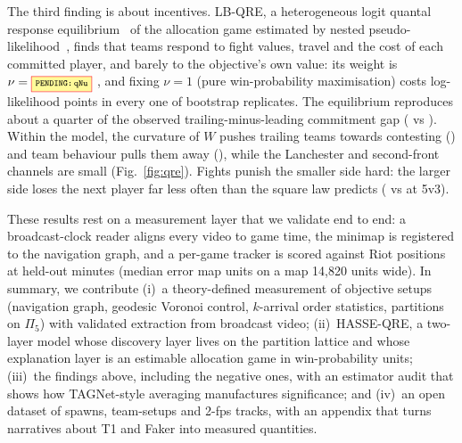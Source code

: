 The third finding is about incentives. LB-QRE, a heterogeneous logit quantal response equilibrium~\cite{mckelvey1995quantal} of the allocation game estimated by nested pseudo-likelihood~\cite{aguirregabiria2007sequential}, finds that teams respond to fight values, travel and the cost of each committed player, and barely to the objective's own value: its weight is $\nu=\V{qNu}$ , and fixing $\nu=1$ (pure win-probability maximisation) costs  log-likelihood points in every one of  bootstrap replicates.
The equilibrium reproduces about a quarter of the observed trailing-minus-leading commitment gap ( vs \pp).
Within the model, the curvature of $W$ pushes trailing teams towards contesting (\pp) and team behaviour pulls them away (\pp), while the Lanchester and second-front channels are small (Fig.~\ref{fig:qre}).
Fights punish the smaller side hard: the larger side loses the next player far less often than the square law predicts ( vs  at 5v3).

These results rest on a measurement layer that we validate end to end: a broadcast-clock reader aligns every video to game time, the minimap is registered to the navigation graph, and a per-game tracker is scored against Riot positions at held-out minutes (median error  map units on a map 14,820 units wide).
In summary, we contribute
(i)~a theory-defined measurement of objective setups (navigation graph, geodesic Voronoi control, $k$-arrival order statistics, partitions on $\Pi_5$) with validated extraction from broadcast video;
(ii)~HASSE-QRE, a two-layer model whose discovery layer lives on the partition lattice and whose explanation layer is an estimable allocation game in win-probability units;
(iii)~the findings above, including the negative ones, with an estimator audit that shows how TAGNet-style averaging manufactures significance; and
(iv)~an open dataset of  spawns,  team-setups and 2-fps tracks, with an appendix that turns narratives about T1 and Faker into measured quantities.
